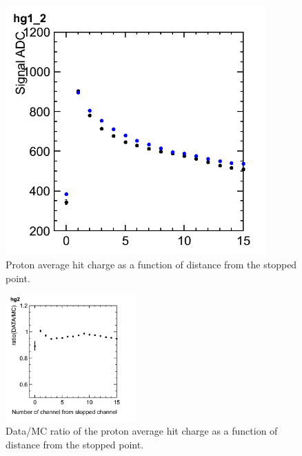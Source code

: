 \documentclass{cernyrep}
\begin{document}
\begin{figure}[htbp]
 \begin{center}
  \includegraphics[width=100mm,bb=0 0 393 376]{ProtonQvsR2.png}
 \end{center}
 \caption{Proton average hit charge as a function of distance from the stopped point.}
 \label{fig:ProtonQvsR2}
\end{figure}

\begin{figure}[htbp]
 \begin{center}
  \includegraphics[width=50mm,bb=0 0 426 413]{ProtonQRvsR.png}
 \end{center}
 \caption{Data/MC ratio of the proton average hit charge as a function of distance from the stopped point.}
 \label{fig:ProtonQRvsR}
\end{figure}


\clearpage
\end{document}

